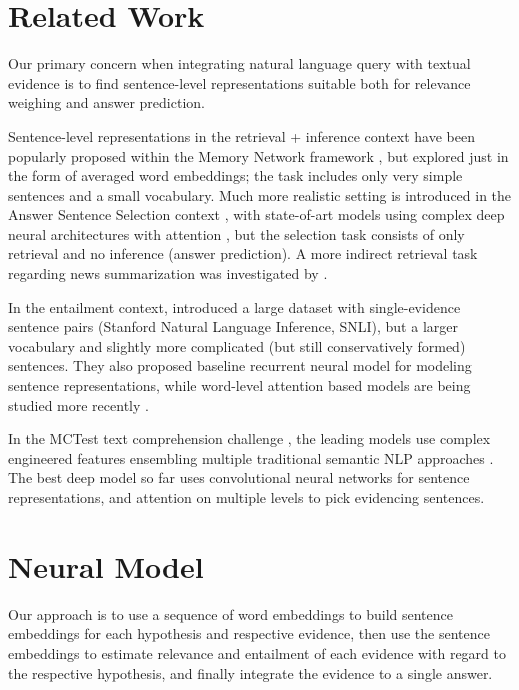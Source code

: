 \documentclass[11pt]{article}
\begin{document}
\section{Related Work}
\label{sec:relwork}

Our primary concern when integrating natural language query with
textual evidence is to find sentence-level representations suitable
both for relevance weighing and answer prediction.

Sentence-level representations in the retrieval + inference context have been
popularly proposed within the Memory Network framework \cite{MemNN},
but explored just in the form of averaged word embeddings; the task includes
only very simple sentences and a small vocabulary.
Much more realistic setting is introduced in the Answer Sentence Selection
context \cite{AnsselWang} \cite{sps}, with state-of-art models using complex
deep neural architectures with attention \cite{attnpooling}, but the selection
task consists of only retrieval and no inference (answer prediction).
A more indirect retrieval task regarding news summarization was investigated
by \cite{AttSum}.

In the entailment context, \cite{SNLI} introduced a large dataset
with single-evidence sentence pairs (Stanford Natural Language Inference, SNLI),
but a larger vocabulary and
slightly more complicated (but still conservatively formed) sentences.
They also proposed baseline recurrent neural model for modeling
sentence representations, while word-level attention based models
are being studied more recently \cite{SNLIattn} \cite{LSTMMR}.


In the MCTest text comprehension challenge \cite{MCTest}, the
leading models use complex engineered features ensembling multiple traditional
semantic NLP approaches \cite{MCWang}. The best deep model so far
\cite{HABCNN} uses convolutional neural networks for sentence
representations, and attention on multiple levels to pick evidencing
sentences.

\section{Neural Model}
\label{sec:model}

Our approach is to use a sequence of word embeddings to build
sentence embeddings for each hypothesis and respective evidence,
then use the sentence embeddings to estimate relevance and
entailment of each evidence with regard to the respective
hypothesis, and finally integrate the evidence to a single answer.
\end{document}
